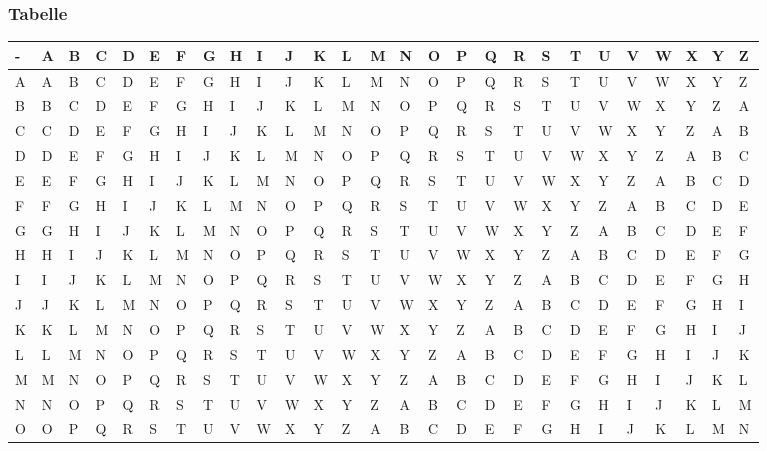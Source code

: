 \documentclass[10pt]{article}
\begin{document}
\subsubsection{Tabelle}
{
\setlength{\tabcolsep}{0.2em}
\begin{tabular}{l| l l l l l l l l l l l l l l l l l l l l l l l l l l}
- & A & B & C & D & E & F & G & H & I & J & K & L & M & N & O & P & Q & R & S & T & U & V & W & X & Y & Z\\
\hline
A & A & B & C & D & E & F & G & H & I & J & K & L & M & N & O & P & Q & R & S & T & U & V & W & X & Y & Z\\
B & B & C & D & E & F & G & H & I & J & K & L & M & N & O & P & Q & R & S & T & U & V & W & X & Y & Z & A\\
C & C & D & E & F & G & H & I & J & K & L & M & N & O & P & Q & R & S & T & U & V & W & X & Y & Z & A & B\\
D & D & E & F & G & H & I & J & K & L & M & N & O & P & Q & R & S & T & U & V & W & X & Y & Z & A & B & C\\
E & E & F & G & H & I & J & K & L & M & N & O & P & Q & R & S & T & U & V & W & X & Y & Z & A & B & C & D\\
F & F & G & H & I & J & K & L & M & N & O & P & Q & R & S & T & U & V & W & X & Y & Z & A & B & C & D & E\\
G & G & H & I & J & K & L & M & N & O & P & Q & R & S & T & U & V & W & X & Y & Z & A & B & C & D & E & F\\
H & H & I & J & K & L & M & N & O & P & Q & R & S & T & U & V & W & X & Y & Z & A & B & C & D & E & F & G\\
I & I & J & K & L & M & N & O & P & Q & R & S & T & U & V & W & X & Y & Z & A & B & C & D & E & F & G & H\\
J & J & K & L & M & N & O & P & Q & R & S & T & U & V & W & X & Y & Z & A & B & C & D & E & F & G & H & I\\
K & K & L & M & N & O & P & Q & R & S & T & U & V & W & X & Y & Z & A & B & C & D & E & F & G & H & I & J\\
L & L & M & N & O & P & Q & R & S & T & U & V & W & X & Y & Z & A & B & C & D & E & F & G & H & I & J & K\\
M & M & N & O & P & Q & R & S & T & U & V & W & X & Y & Z & A & B & C & D & E & F & G & H & I & J & K & L\\
N & N & O & P & Q & R & S & T & U & V & W & X & Y & Z & A & B & C & D & E & F & G & H & I & J & K & L & M\\
O & O & P & Q & R & S & T & U & V & W & X & Y & Z & A & B & C & D & E & F & G & H & I & J & K & L & M & N\\

\end{tabular}}
\end{document}
